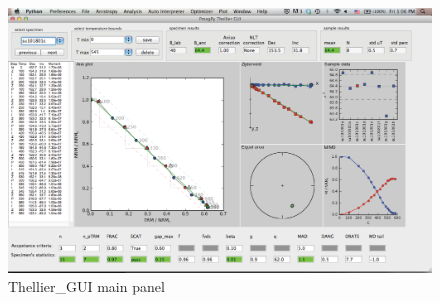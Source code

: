 \documentclass[12pt]{article}
\begin{document}
\begin{figure}[h!]
	\includegraphics[width=1.0\textwidth]{EPSFiles/Screenshot_main_panel.eps}
	 \caption{Thellier\_GUI main panel}
\end{figure}
\end{document}
